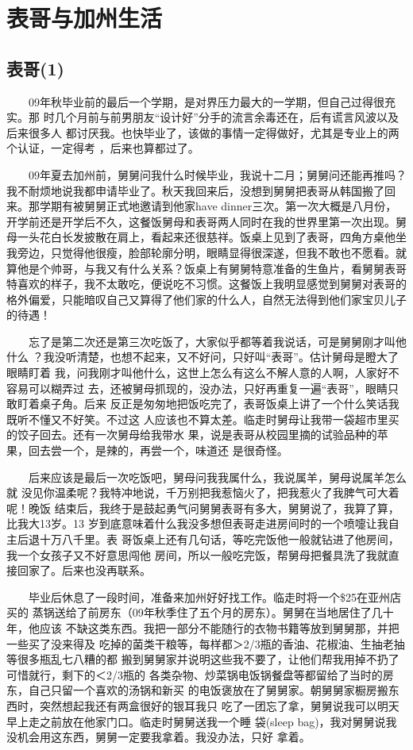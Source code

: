 \documentclass[12pt]{book}
\begin{document}
\chapter{表哥与加州生活}
\label{sec-7}
\section{表哥(1)}
\label{sec-7-1}

　　09年秋毕业前的最后一个学期，是对界压力最大的一学期，但自己过得很充实。那
时几个月前与前男朋友“设计好”分手的流言余毒还在，后有谎言风波以及后来很多人
都讨厌我。也快毕业了，该做的事情一定得做好，尤其是专业上的两个认证，一定得考
，后来也算都过了。

　　09年夏去加州前，舅舅问我什么时候毕业，我说十二月；舅舅问还能再推吗？我不耐烦地说我都申请毕业了。秋天我回来后，没想到舅舅把表哥从韩国搬了回来。那学期有被舅舅正式地邀请到他家have dinner三次。第一次大概是八月份，开学前还是开学后不久，这餐饭舅母和表哥两人同时在我的世界里第一次出现。舅母一头花白长发披散在肩上，看起来还很慈祥。饭桌上见到了表哥，四角方桌他坐我旁边，只觉得他很瘦，脸部轮廓分明，眼睛显得很深遂，但我不敢也不愿看。就算他是个帅哥，与我又有什么关系？饭桌上有舅舅特意准备的生鱼片，看舅舅表哥特喜欢的样子，我不太敢吃，便说吃不习惯。这餐饭上我明显感觉到舅舅对表哥的格外偏爱，只能暗叹自己又算得了他们家的什么人，自然无法得到他们家宝贝儿子的待遇！

　　忘了是第二次还是第三次吃饭了，大家似乎都等着我说话，可是舅舅刚才叫他什么
？我没听清楚，也想不起来，又不好问，只好叫“表哥”。估计舅母是瞪大了眼睛盯着
我，问我刚才叫他什么，这世上怎么有这么不解人意的人啊，人家好不容易可以糊弄过
去，还被舅母抓现的，没办法，只好再重复一遍“表哥”，眼睛只敢盯着桌子角。后来
反正是匆匆地把饭吃完了，表哥饭桌上讲了一个什么笑话我既听不懂又不好笑。不过这
人应该也不算太差。临走时舅母让我带一袋超市里买的饺子回去。还有一次舅母给我带水
果，说是表哥从校园里摘的试验品种的苹果，回去尝一个，是辣的，再尝一个，味道还
是很奇怪。

　　后来应该是最后一次吃饭吧，舅母问我我属什么，我说属羊，舅母说属羊怎么就
没见你温柔呢？我特冲地说，千万别把我惹恼火了，把我惹火了我脾气可大着呢！晚饭
结束后，我终于是鼓起勇气问舅舅表哥有多大，舅舅说了，我算了算，比我大13岁。13
岁到底意味着什么我没多想但表哥走进房间时的一个喷嚏让我自主后退十万八千里。表
哥饭桌上还有几句话，等吃完饭他一般就钻进了他房间，我一个女孩子又不好意思闯他
房间，所以一般吃完饭，帮舅母把餐具洗了我就直接回家了。后来也没再联系。

　　毕业后休息了一段时间，准备来加州好好找工作。临走时将一个\$25在亚州店买的
蒸锅送给了前房东（09年秋季住了五个月的房东）。舅舅在当地居住了几十年，他应该
不缺这类东西。我把一部分不能随行的衣物书籍等放到舅舅那，并把一些买了没来得及
吃掉的菌类干粮等，每样都＞2/3瓶的香油、花椒油、生抽老抽等很多瓶乱七八糟的都
搬到舅舅家并说明这些我不要了，让他们帮我用掉不扔了可惜就行，剩下的＜2/3瓶的
各类杂物、炒菜锅电饭锅餐盘等都留给了当时的房东，自己只留一个喜欢的汤锅和新买
的电饭褒放在了舅舅家。朝舅舅家橱房搬东西时，突然想起我还有两盒很好的银耳我只
吃了一团忘了拿，舅舅说我可以明天早上走之前放在他家门口。临走时舅舅送我一个睡
袋(sleep bag)，我对舅舅说我没机会用这东西，舅舅一定要我拿着。我没办法，只好
拿着。
\end{document}
